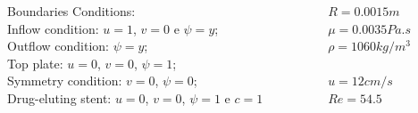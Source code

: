 \begin{frame}
\begin{center}
\begin{columns}[c]
\begin{column}{0.8\textwidth} 
Boundaries Conditions:\\[0.2cm]
Inflow condition: $u=1$, $v=0$ e $\psi=y$;\\[0.1cm]
Outflow condition: $\psi=y$;\\[0.1cm]
Top plate: $u=0$, $v=0$, $\psi=1$;\\[0.1cm]
Symmetry condition: $v=0$, $\psi=0$; \\[0.1cm]
Drug-eluting stent: $u=0$, $v=0$, $\psi=1$ e $c=1$
\end{column}
\hspace{-1cm}
\begin{column}{0.3\textwidth}
$R=0.0015m$\\[0.1cm]
$\mu=0.0035Pa.s$\\[0.1cm]
$\rho=1060kg/m^3$\\[0.1cm]\\
$u=12cm/s$\\[0.1cm]
$Re=54.5$
\end{column}
\end{columns}
\end{center}
\end{frame}



